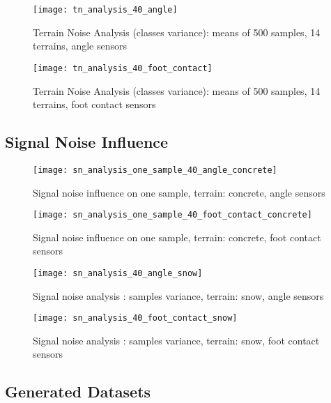 \begin{figure}[H]
  \centering
  \texttt{[image: tn\_analysis\_40\_angle]}
  \caption{Terrain Noise Analysis (classes variance): means of 500 samples, 14 terrains, angle sensors}
  \label{fig:tn_analysis_angle}
\end{figure}

\begin{figure}[H]
  \centering
  \texttt{[image: tn\_analysis\_40\_foot\_contact]}
  \caption{Terrain Noise Analysis (classes variance): means of 500 samples, 14 terrains, foot contact sensors}
  \label{fig:tn_analysis_foot_contact}
\end{figure}

\subsection{Signal Noise Influence} \label{ssec:signal_noise_influence}

\begin{figure}[H]
  \centering
  \texttt{[image: sn\_analysis\_one\_sample\_40\_angle\_concrete]}
  \caption{Signal noise influence on one sample, terrain: concrete, angle sensors}
  \label{fig:sn_analysis_one_sample_angle_concrete}
\end{figure}

\begin{figure}[H]
  \centering
  \texttt{[image: sn\_analysis\_one\_sample\_40\_foot\_contact\_concrete]}
  \caption{Signal noise influence on one sample, terrain: concrete, foot contact sensors}
  \label{fig:sn_analysis_one_sample_foot_contact_concrete}
\end{figure}

\begin{figure}[H]
  \centering
  \texttt{[image: sn\_analysis\_40\_angle\_snow]}
  \caption{Signal noise analysis : samples variance, terrain: snow, angle sensors}
  \label{fig:sn_analysis_angle_snow}
\end{figure}

\begin{figure}[H]
  \centering
  \texttt{[image: sn\_analysis\_40\_foot\_contact\_snow]}
  \caption{Signal noise analysis : samples variance, terrain: snow, foot contact sensors}
  \label{fig:sn_analysis_foot_contact_snow}
\end{figure}

\subsection{Generated Datasets} \label{ssec:generated_datasets}

